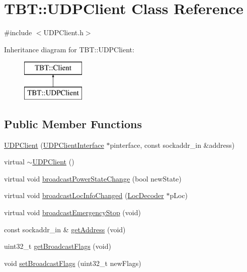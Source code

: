 \hypertarget{classTBT_1_1UDPClient}{}\section{T\+BT\+:\+:U\+D\+P\+Client Class Reference}
\label{classTBT_1_1UDPClient}


{\ttfamily \#include $<$U\+D\+P\+Client.\+h$>$}

Inheritance diagram for T\+BT\+:\+:U\+D\+P\+Client\+:\begin{figure}[H]
\begin{center}
\leavevmode
\includegraphics[height=2.000000cm]{classTBT_1_1UDPClient}
\end{center}
\end{figure}
\subsection*{Public Member Functions}
\begin{DoxyCompactItemize}
\item 
\hyperlink{classTBT_1_1UDPClient_a7b6f7858b9d3a7243bdd48fbf150b9f8_a7b6f7858b9d3a7243bdd48fbf150b9f8}{U\+D\+P\+Client} (\hyperlink{classTBT_1_1UDPClientInterface}{U\+D\+P\+Client\+Interface} $\ast$pinterface, const sockaddr\+\_\+in \&address)
\item 
virtual \hyperlink{classTBT_1_1UDPClient_a65ed6ba0adf48e065e99b31c7d8aec26_a65ed6ba0adf48e065e99b31c7d8aec26}{$\sim$\+U\+D\+P\+Client} ()
\item 
virtual void \hyperlink{classTBT_1_1UDPClient_aafe098769858c054b025bf3b3ccacf30_aafe098769858c054b025bf3b3ccacf30}{broadcast\+Power\+State\+Change} (bool new\+State)
\item 
virtual void \hyperlink{classTBT_1_1UDPClient_a90c650259501f341f531ede72210624a_a90c650259501f341f531ede72210624a}{broadcast\+Loc\+Info\+Changed} (\hyperlink{classTBT_1_1LocDecoder}{Loc\+Decoder} $\ast$p\+Loc)
\item 
virtual void \hyperlink{classTBT_1_1UDPClient_a378d141aa807a685b1e70adaacd5fc17_a378d141aa807a685b1e70adaacd5fc17}{broadcast\+Emergency\+Stop} (void)
\item 
const sockaddr\+\_\+in \& \hyperlink{classTBT_1_1UDPClient_a8471b71655c61bf074b70b62a6dffbf1_a8471b71655c61bf074b70b62a6dffbf1}{get\+Address} (void)
\item 
uint32\+\_\+t \hyperlink{classTBT_1_1UDPClient_a18da0bdc657f707f4c0af6cd3b1e6031_a18da0bdc657f707f4c0af6cd3b1e6031}{get\+Broadcast\+Flags} (void)
\item 
void \hyperlink{classTBT_1_1UDPClient_a23a0b0ecf47f8a2fe018a570f46ecdfe_a23a0b0ecf47f8a2fe018a570f46ecdfe}{set\+Broadcast\+Flags} (uint32\+\_\+t new\+Flags)
\end{DoxyCompactItemize}

